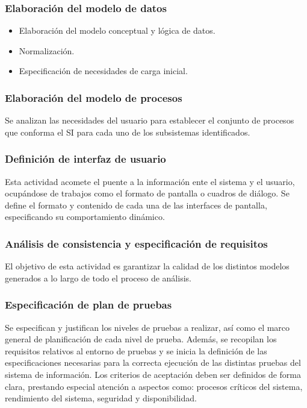 \documentclass[11pt,a4paper,spanish,twoside]{book}
\begin{document}
\subsubsection{Elaboración del modelo de datos}
    \begin{itemize}
    \item Elaboración del modelo conceptual y lógica de datos.
    \item Normalización.
    \item Especificación de necesidades de carga inicial.
    \end{itemize}

\subsubsection{Elaboración del modelo de procesos}
Se analizan las necesidades del usuario para establecer el conjunto de
procesos que conforma el SI para cada uno de los subsistemas
identificados.

\subsubsection{Definición de interfaz de usuario}
Esta actividad acomete el puente a la información ente el sistema y el
usuario, ocupándose de trabajos como el formato de pantalla o cuadros de
diálogo. Se define el formato y contenido de cada una de las interfaces de 
pantalla, especificando su comportamiento dinámico.

\subsubsection{Análisis de consistencia y especificación de requisitos}
El objetivo de esta actividad es garantizar la calidad de los distintos
modelos generados a lo largo de todo el proceso de análisis.

\subsubsection{Especificación de plan de pruebas}
Se especifican y justifican los niveles de pruebas a realizar, así como el 
marco general de planificación de cada nivel de prueba. Además, se recopilan 
los requisitos relativos al entorno de pruebas y se inicia la definición de las
especificaciones necesarias para la correcta ejecución de las distintas
pruebas del sistema de información. Los criterios de aceptación deben
ser definidos de forma clara, prestando especial atención a aspectos como:
procesos críticos del sistema, rendimiento del sistema, seguridad y 
disponibilidad.
\end{document}
